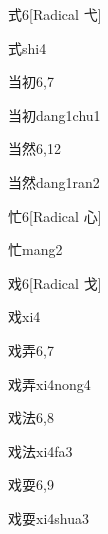\begin{entry}{式}{6}[Radical 弋]
  \begin{phonetics}{式}{shi4}
  \end{phonetics}
\end{entry}

\begin{entry}{当初}{6,7}
  \begin{phonetics}{当初}{dang1chu1}
  \end{phonetics}
\end{entry}

\begin{entry}{当然}{6,12}
  \begin{phonetics}{当然}{dang1ran2}
  \end{phonetics}
\end{entry}

\begin{entry}{忙}{6}[Radical 心]
  \begin{phonetics}{忙}{mang2}
  \end{phonetics}
\end{entry}

\begin{entry}{戏}{6}[Radical 戈]
  \begin{phonetics}{戏}{xi4}
  \end{phonetics}
\end{entry}

\begin{entry}{戏弄}{6,7}
  \begin{phonetics}{戏弄}{xi4nong4}
  \end{phonetics}
\end{entry}

\begin{entry}{戏法}{6,8}
  \begin{phonetics}{戏法}{xi4fa3}
  \end{phonetics}
\end{entry}

\begin{entry}{戏耍}{6,9}
  \begin{phonetics}{戏耍}{xi4shua3}
  \end{phonetics}
\end{entry}

